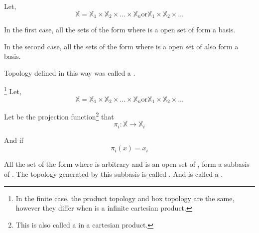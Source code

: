 \begin{definition}\label{def:BoxTopology}
      Let,
      \begin{equation*}
            \mathbb{X} = \mathbb{X}_{1} \times \mathbb{X}_{2} \times \dots \times \mathbb{X}_{n} \text{or} \mathbb{X}_{1} \times \mathbb{X}_{2} \times \dots
      \end{equation*}

      In the first case, all the sets of the form  where  is a open set of  form a basis.

      In the second case, all the sets of the form  where  is a open set of  also form a basis.

      Topology defined in this way was called a .
\end{definition}

\begin{definition}\label{def:ProductTopologyInfinite}\footnote{
      In the finite case, the product topology and box topology are the same, however they differ when  is a infinite cartesian product.
}
      Let,
      \begin{equation*}
            \mathbb{X} = \mathbb{X}_{1} \times \mathbb{X}_{2} \times \dots \times \mathbb{X}_{n} \text{or} \mathbb{X}_{1} \times \mathbb{X}_{2} \times \dots
      \end{equation*}

      Let  be the projection function\footnote{
            This is also called a \label{def:ProjectionMapping} in a cartesian product.
      } that
      \begin{equation*}
            \pi_{i}: \mathbb{X} \rightarrow \mathbb{X}_{i}
      \end{equation*}

      And if 
      \begin{equation*}
            \pi_{i}(x) = x_{i}
      \end{equation*}

      All the set of the form  where  is arbitrary and  is an open set of , form a subbasis of . The topology generated by this subbasis is called . And  is called a .
\end{definition}

